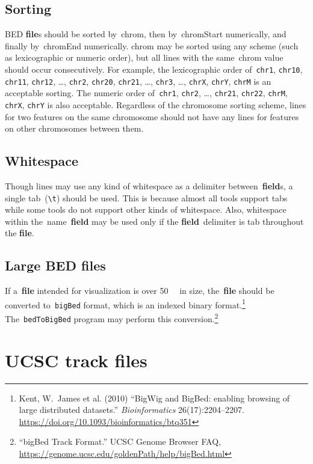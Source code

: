 \documentclass[11pt]{article}
\begin{document}
\subsection{Sorting}
\Ac{BED} \textbf{file}s should be sorted by~\textsf{chrom}, then by~\textsf{chromStart} numerically, and finally by~\textsf{chromEnd} numerically.
\textsf{chrom} may be sorted using any scheme (such as lexicographic or numeric order), but all lines with the same~\textsf{chrom} value should occur consecutively.
For example, the lexicographic order of~\texttt{chr1}, \texttt{chr10}, \texttt{chr11}, \texttt{chr12}, {\ldots}, \texttt{chr2}, \texttt{chr20}, \texttt{chr21}, {\ldots}, \texttt{chr3}, {\ldots}, \texttt{chrX}, \texttt{chrY}, \texttt{chrM} is an acceptable sorting.
The numeric order of~\texttt{chr1}, \texttt{chr2}, {\ldots}, \texttt{chr21}, \texttt{chr22}, \texttt{chrM}, \texttt{chrX}, \texttt{chrY} is also acceptable.
Regardless of the chromosome sorting scheme, lines for two features on the same chromosome should not have any lines for features on other chromosomes between them.

\subsection{Whitespace}\label{sec:whitespace}
Though lines may use any kind of whitespace as a delimiter between~\textbf{field}s, a single tab~(\texttt{{\textbackslash}t}) should be used.
This is because almost all tools support tabs while some tools do not support other kinds of whitespace.
Also, whitespace within the~\textsf{name}~\textbf{field} may be used only if the \textbf{field}~delimiter is tab throughout the \textbf{file}.

\subsection{Large \acs{BED} files}
If a~\textbf{file} intended for visualization is over \SI{50}{\mebi\byte} in size, the~\textbf{file} should be converted to~\texttt{bigBed} format, which is an indexed binary format.\footnote{Kent, W.~James et al.
  (2010) ``BigWig and BigBed: enabling browsing of large distributed datasets.''
  \emph{Bioinformatics} 26(17):2204--2207.
  \url{https://doi.org/10.1093/bioinformatics/btq351}}
The~\texttt{bedToBigBed} program may perform this conversion.\footnote{``bigBed Track Format.''
  \Ac{UCSC} Genome Browser FAQ, \url{https://genome.ucsc.edu/goldenPath/help/bigBed.html}}

\section{\acs{UCSC} track files}
\end{document}
